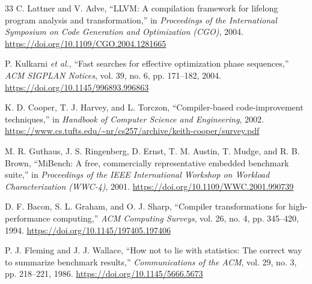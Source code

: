 \documentclass[conference]{IEEEtran}
\begin{document}
\begin{thebibliography}{33}
C. Lattner and V. Adve,
``LLVM: A compilation framework for lifelong program analysis and transformation,''
in \textit{Proceedings of the International Symposium on Code Generation and Optimization (CGO)}, 2004.
\url{https://doi.org/10.1109/CGO.2004.1281665}

P. Kulkarni \textit{et al.},
``Fast searches for effective optimization phase sequences,''
\textit{ACM SIGPLAN Notices}, vol. 39, no. 6, pp. 171--182, 2004.
\url{https://doi.org/10.1145/996893.996863}

K. D. Cooper, T. J. Harvey, and L. Torczon,
``Compiler-based code-improvement techniques,''
in \textit{Handbook of Computer Science and Engineering}, 2002.
\url{https://www.cs.tufts.edu/~nr/cs257/archive/keith-cooper/survey.pdf}

M. R. Guthaus, J. S. Ringenberg, D. Ernst, T. M. Austin, T. Mudge, and R. B. Brown,
``MiBench: A free, commercially representative embedded benchmark suite,''
in \textit{Proceedings of the IEEE International Workshop on Workload Characterization (WWC-4)}, 2001.
\url{https://doi.org/10.1109/WWC.2001.990739}

D. F. Bacon, S. L. Graham, and O. J. Sharp,
``Compiler transformations for high-performance computing,'' \textit{ACM Computing Surveys}, vol. 26, no. 4, pp. 345--420, 1994.
\url{https://doi.org/10.1145/197405.197406}

P. J. Fleming and J. J. Wallace,
``How not to lie with statistics: The correct way to summarize benchmark results,''
\textit{Communications of the ACM}, vol. 29, no. 3, pp. 218--221, 1986.
\url{https://doi.org/10.1145/5666.5673}

\end{thebibliography}
\end{document}
